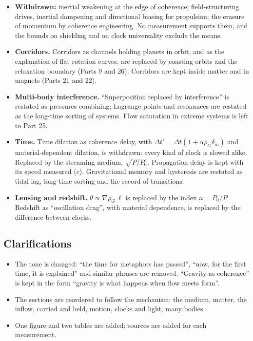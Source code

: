 \begin{itemize}
\item \textbf{Withdrawn:} inertial weakening at the edge of coherence; field-structuring drives, inertial dampening and directional biasing for propulsion; the erasure of momentum by coherence engineering. No measurement supports them, and the bounds on shielding and on clock universality exclude the means.
\item \textbf{Corridors.} Corridors as channels holding planets in orbit, and as the explanation of flat rotation curves, are replaced by coasting orbits and the relaxation boundary (Parts 9 and 26). Corridors are kept inside matter and in magnets (Parts 21 and 22).
\item \textbf{Multi-body interference.} ``Superposition replaced by interference'' is restated as pressures combining; Lagrange points and resonances are restated as the long-time sorting of systems. Flow saturation in extreme systems is left to Part 25.
\item \textbf{Time.} Time dilation as coherence delay, with $\Delta t' = \Delta t(1 + \alpha\rho_G\delta_m)$ and material-dependent dilation, is withdrawn: every kind of clock is slowed alike. Replaced by the streaming medium, $\sqrt{P/P_0}$. Propagation delay is kept with its speed measured ($c$). Gravitational memory and hysteresis are restated as tidal lag, long-time sorting and the record of transitions.
\item \textbf{Lensing and redshift.} $\theta \propto \nabla\rho_G\,\ell$ is replaced by the index $n = P_0/P$. Redshift as ``oscillation drag'', with material dependence, is replaced by the difference between clocks.
\end{itemize}

\subsection*{Clarifications}
\begin{itemize}
\item The tone is changed: ``the time for metaphors has passed'', ``now, for the first time, it is explained'' and similar phrases are removed. ``Gravity as coherence'' is kept in the form ``gravity is what happens when flow meets form''.
\item The sections are reordered to follow the mechanism: the medium, matter, the inflow, carried and held, motion, clocks and light, many bodies.
\item One figure and two tables are added; sources are added for each measurement.
\end{itemize}



